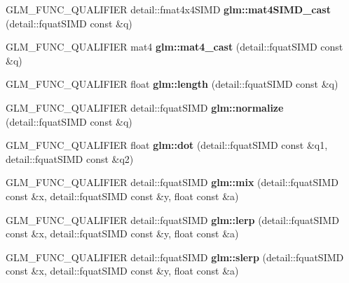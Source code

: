 \begin{DoxyCompactItemize}
\item 
\mbox{\label{simd__quat_8inl_a0b2e5499072a338c1256735ecbf363ff}} 
G\+L\+M\+\_\+\+F\+U\+N\+C\+\_\+\+Q\+U\+A\+L\+I\+F\+I\+ER detail\+::fmat4x4\+S\+I\+MD {\bfseries glm\+::mat4\+S\+I\+M\+D\+\_\+cast} (detail\+::fquat\+S\+I\+MD const \&q)
\item 
\mbox{\label{simd__quat_8inl_a350adcfec63eb015dd2d9ee14a4e8cde}} 
G\+L\+M\+\_\+\+F\+U\+N\+C\+\_\+\+Q\+U\+A\+L\+I\+F\+I\+ER mat4 {\bfseries glm\+::mat4\+\_\+cast} (detail\+::fquat\+S\+I\+MD const \&q)
\item 
\mbox{\label{simd__quat_8inl_aaa8b73fac4aaa2acdfc98adc48cd15d0}} 
G\+L\+M\+\_\+\+F\+U\+N\+C\+\_\+\+Q\+U\+A\+L\+I\+F\+I\+ER float {\bfseries glm\+::length} (detail\+::fquat\+S\+I\+MD const \&q)
\item 
\mbox{\label{simd__quat_8inl_a31e71acc931a3619a3305958048cfa8d}} 
G\+L\+M\+\_\+\+F\+U\+N\+C\+\_\+\+Q\+U\+A\+L\+I\+F\+I\+ER detail\+::fquat\+S\+I\+MD {\bfseries glm\+::normalize} (detail\+::fquat\+S\+I\+MD const \&q)
\item 
\mbox{\label{simd__quat_8inl_ab68375a7ad5f9dc3db97323af1326bbb}} 
G\+L\+M\+\_\+\+F\+U\+N\+C\+\_\+\+Q\+U\+A\+L\+I\+F\+I\+ER float {\bfseries glm\+::dot} (detail\+::fquat\+S\+I\+MD const \&q1, detail\+::fquat\+S\+I\+MD const \&q2)
\item 
\mbox{\label{simd__quat_8inl_a1539ad90a9eb88f535d9dfacba04c1c9}} 
G\+L\+M\+\_\+\+F\+U\+N\+C\+\_\+\+Q\+U\+A\+L\+I\+F\+I\+ER detail\+::fquat\+S\+I\+MD {\bfseries glm\+::mix} (detail\+::fquat\+S\+I\+MD const \&x, detail\+::fquat\+S\+I\+MD const \&y, float const \&a)
\item 
\mbox{\label{simd__quat_8inl_a4d8cd3fe0165431fb1c54cbeb432bf26}} 
G\+L\+M\+\_\+\+F\+U\+N\+C\+\_\+\+Q\+U\+A\+L\+I\+F\+I\+ER detail\+::fquat\+S\+I\+MD {\bfseries glm\+::lerp} (detail\+::fquat\+S\+I\+MD const \&x, detail\+::fquat\+S\+I\+MD const \&y, float const \&a)
\item 
\mbox{\label{simd__quat_8inl_a40d5134f42aaa1511518d2abe97e0ebc}} 
G\+L\+M\+\_\+\+F\+U\+N\+C\+\_\+\+Q\+U\+A\+L\+I\+F\+I\+ER detail\+::fquat\+S\+I\+MD {\bfseries glm\+::slerp} (detail\+::fquat\+S\+I\+MD const \&x, detail\+::fquat\+S\+I\+MD const \&y, float const \&a)

\end{DoxyCompactItemize}
